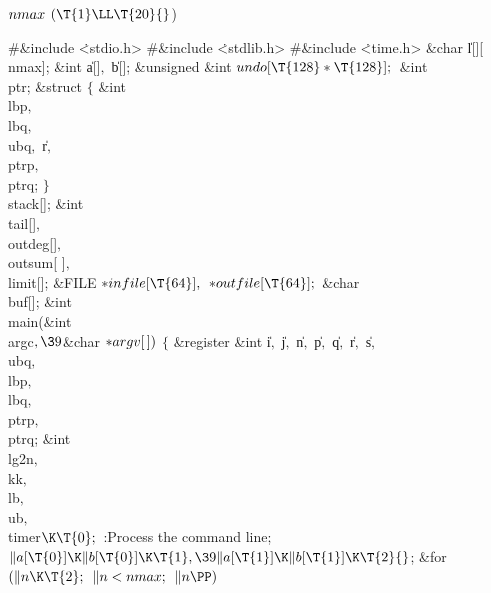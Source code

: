 \Y\B\4\D$\\{nmax}$ \5
$(\T{1}\LL\T{20}{}$)\par
\Y\B\8\#\&{include} \.{<stdio.h>}\6
\8\#\&{include} \.{<stdlib.h>}\6
\8\#\&{include} \.{<time.h>}\6
\&{char} \|l[][\\{nmax}];\6
\&{int} \|a[]${},{}$ \|b[];\6
\&{unsigned} \&{int} ${}\\{undo}[\T{128}*\T{128}];{}$\6
\&{int} \\{ptr};\6
\&{struct} ${}\{{}$\1\6
\&{int} \\{lbp}${},{}$ \\{lbq}${},{}$ \\{ubq}${},{}$ \|r${},{}$ \\{ptrp}${},{}$
\\{ptrq};\2\6
${}\}{}$ \\{stack}[];\6
\&{int} \\{tail}[]${},{}$ \\{outdeg}[]${},{}$ \\{outsum}[%
]${},{}$ \\{limit}[];\6
\&{FILE} ${}{*}\\{infile}[\T{64}],{}$ ${}{*}\\{outfile}[\T{64}];{}$\6
\&{char} \\{buf}[];\7
\&{int} \\{main}(\&{int} \\{argc}${},\39{}$\&{char} ${}{*}\\{argv}[\,]){}$\1\1%
\2\2\6
${}\{{}$\1\6
\&{register} \&{int} \|i${},{}$ \|j${},{}$ \|n${},{}$ \|p${},{}$ \|q${},{}$ %
\|r${},{}$ \|s${},{}$ \\{ubq}${},{}$ \\{lbp}${},{}$ \\{lbq}${},{}$ %
\\{ptrp}${},{}$ \\{ptrq};\6
\&{int} \\{lg2n}${},{}$ \\{kk}${},{}$ \\{lb}${},{}$ \\{ub}${},{}$ \\{timer}${}%
\K\T{0};{}$\7
:Process the command line\X;\6
${}\|a[\T{0}]\K\|b[\T{0}]\K\T{1},\39\|a[\T{1}]\K\|b[\T{1}]\K\T{2}{}$;\6
\&{for} ${}(\|n\K\T{2};{}$ ${}\|n<\\{nmax};{}$ ${}\|n\PP){}$\5
